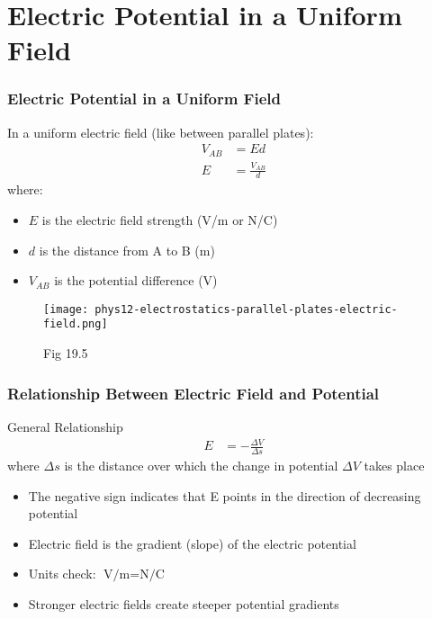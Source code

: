 \documentclass{beamer}
\begin{document}
\section{Electric Potential in a Uniform Field}

\begin{frame}
    \frametitle{Electric Potential in a Uniform Field}
    
    In a uniform electric field (like between parallel plates):
    \begin{align}
        V_{AB} &= Ed \\
        E &= \frac{V_{AB}}{d}
    \end{align}
    where:
    \begin{itemize}
        \item $E$ is the electric field strength (V/m or N/C)
        \item $d$ is the distance from A to B (m)
        \item $V_{AB}$ is the potential difference (V)
    \end{itemize}
    \end{frame}

\begin{frame}
    \begin{figure}
        \centering
        \texttt{[image: phys12-electrostatics-parallel-plates-electric-field.png]}
        \caption{Fig 19.5}
    \end{figure}
\end{frame}

\begin{frame}
    \frametitle{Relationship Between Electric Field and Potential}
    
    \begin{block}{General Relationship}
        \begin{align}
            E &= -\frac{\Delta V}{\Delta s}
        \end{align}
        where $\Delta s$ is the distance over which the change in potential $\Delta V$ takes place
    \end{block}
    
    \begin{itemize}
        \item The negative sign indicates that E points in the direction of decreasing potential
        \item Electric field is the gradient (slope) of the electric potential
        \item Units check: $\text{V/m} = \text{N/C}$
        \item Stronger electric fields create steeper potential gradients
    \end{itemize}
\end{frame}
\end{document}
